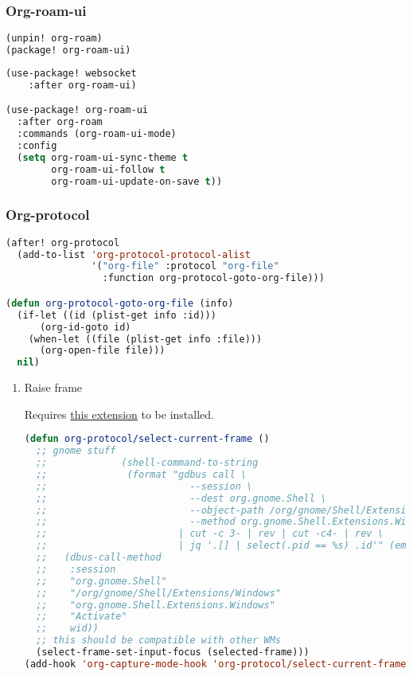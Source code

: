 \documentclass[11pt]{article}
\begin{document}
\subsubsection{Org-roam-ui}
\label{sec:org-roam-ui}
\begin{lstlisting}[language=Lisp]
(unpin! org-roam)
(package! org-roam-ui)
\end{lstlisting}

\begin{lstlisting}[language=Lisp]
(use-package! websocket
    :after org-roam-ui)

(use-package! org-roam-ui
  :after org-roam
  :commands (org-roam-ui-mode)
  :config
  (setq org-roam-ui-sync-theme t
        org-roam-ui-follow t
        org-roam-ui-update-on-save t))
\end{lstlisting}

\subsubsection{Org-protocol}
\label{sec:org-protocol}
\begin{lstlisting}[language=Lisp]
(after! org-protocol
  (add-to-list 'org-protocol-protocol-alist
               '("org-file" :protocol "org-file"
                 :function org-protocol-goto-org-file)))

(defun org-protocol-goto-org-file (info)
  (if-let ((id (plist-get info :id)))
      (org-id-goto id)
    (when-let ((file (plist-get info :file)))
      (org-open-file file)))
  nil)
\end{lstlisting}

\begin{enumerate}
  \item Raise frame
  \label{sec:raise-frame}

  Requires \href{https://extensions.gnome.org/extension/4724/window-calls/}{this extension} to be installed.

\begin{lstlisting}[language=Lisp]
(defun org-protocol/select-current-frame ()
  ;; gnome stuff
  ;;             (shell-command-to-string
  ;;              (format "gdbus call \
  ;;                         --session \
  ;;                         --dest org.gnome.Shell \
  ;;                         --object-path /org/gnome/Shell/Extensions/Windows \
  ;;                         --method org.gnome.Shell.Extensions.Windows.List \
  ;;                       | cut -c 3- | rev | cut -c4- | rev \
  ;;                       | jq '.[] | select(.pid == %s) .id'" (emacs-pid))))))
  ;;   (dbus-call-method
  ;;    :session
  ;;    "org.gnome.Shell"
  ;;    "/org/gnome/Shell/Extensions/Windows"
  ;;    "org.gnome.Shell.Extensions.Windows"
  ;;    "Activate"
  ;;    wid))
  ;; this should be compatible with other WMs
  (select-frame-set-input-focus (selected-frame)))
(add-hook 'org-capture-mode-hook 'org-protocol/select-current-frame)
\end{lstlisting}
\end{enumerate}
\end{document}
